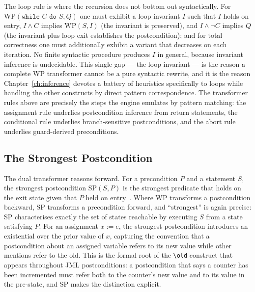 The loop rule is where the recursion does not bottom out syntactically. For
$\mathrm{WP}(\texttt{while } C \texttt{ do } S, Q)$ one must exhibit a loop
invariant $I$ such that $I$ holds on entry, $I \wedge C$ implies
$\mathrm{WP}(S, I)$ (the invariant is preserved), and $I \wedge \neg C$ implies
$Q$ (the invariant plus loop exit establishes the postcondition); and for total
correctness one must additionally exhibit a variant that decreases on each
iteration. No finite syntactic procedure produces $I$ in general, because
invariant inference is undecidable. This single gap --- the loop invariant --- is
the reason a complete WP transformer cannot be a pure syntactic rewrite, and it
is the reason Chapter~\ref{ch:inference} devotes a battery of heuristics
specifically to loops while handling the other constructs by direct pattern
correspondence. The transformer rules above are precisely the steps the engine
emulates by pattern matching: the assignment rule underlies postcondition
inference from return statements, the conditional rule underlies branch-sensitive
postconditions, and the abort rule underlies guard-derived preconditions.

\subsection{The Strongest Postcondition}

The dual transformer reasons forward. For a precondition $P$ and a statement
$S$, the strongest postcondition $\mathrm{SP}(S, P)$ is the strongest
predicate that holds on the exit state given that $P$ held on
entry~\cite{cousot1977abstract}. Where WP transforms a postcondition backward,
SP transforms a precondition forward, and ``strongest'' is again precise: SP
characterises exactly the set of states reachable by executing $S$ from a
state satisfying $P$. For an assignment $x := e$, the strongest postcondition
introduces an existential over the prior value of $x$, capturing the
convention that a postcondition about an assigned variable refers to its new
value while other mentions refer to the old. This is the formal root of the
\texttt{\textbackslash old} construct that appears throughout JML
postconditions: a postcondition that says a counter has been incremented must
refer both to the counter's new value and to its value in the pre-state, and
SP makes the distinction explicit.

